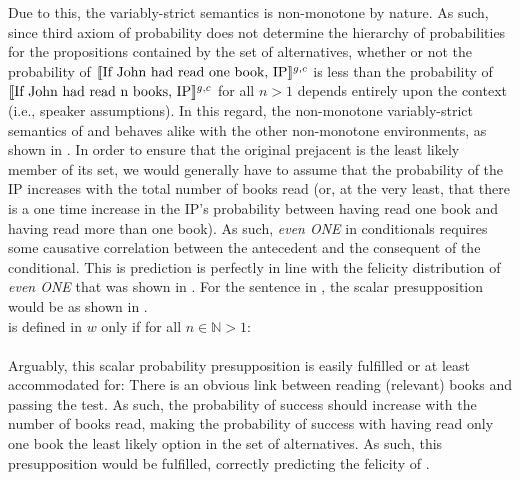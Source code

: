 Due to this, the variably-strict semantics is non-monotone by nature. As such, since  third axiom of probability does not determine the hierarchy of probabilities for the propositions contained by the set of alternatives, whether or not the probability of $\intension[g,c]{If John had read one book, IP}$ is less than the probability of $\intension[g,c]{If John had read n books, IP}$ for all $n>1$ depends entirely upon the context (i.e., speaker assumptions). In this regard, the non-monotone variably-strict semantics of \textcite{Stalnaker1968} and \textcite{Lewis1973} behaves alike with the other non-monotone environments, as shown in . In order to ensure that the original prejacent is the least likely member of its set, we would generally have to assume that the probability of the IP increases with the total number of books read (or, at the very least, that there is a one time increase in the IP's probability between having read one book and having read more than one book). As such, \textit{even \MakeUppercase{one}} in conditionals requires some causative correlation between the antecedent and the consequent of the conditional. This is prediction is perfectly in line with the felicity distribution of \textit{even \MakeUppercase{one}} that was shown in . For the sentence in , the scalar presupposition would be as shown in .
\ex{}
{}\\ is defined in $w$ only if for all $n\in\mathbb{N}>1$:\\
\\
\xe
Arguably, this scalar probability presupposition is easily fulfilled or at least accommodated for: There is an obvious link between reading (relevant) books and passing the test. As such, the probability of success should increase with the number of books read, making the probability of success with having read only one book the least likely option in the set of alternatives. As such, this presupposition would be fulfilled, correctly predicting the felicity of .

